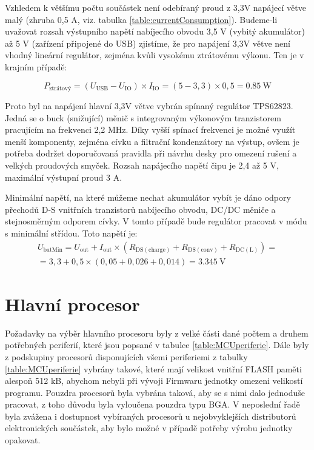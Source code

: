 

Vzhledem k většímu počtu součástek není odebíraný proud z 3,3V napájecí větve malý (zhruba 0,5 A, viz. tabulka \ref{table:currentConsumption}). Budeme-li uvažovat rozsah výstupního napětí nabíjecího obvodu 3,5 V (vybitý akumulátor) až 5 V (zařízení připojené do \ac{USB}) zjistíme, že pro napájení 3,3V větve není vhodný lineární regulátor, zejména kvůli vysokému ztrátovému výkonu. Ten je v krajním případě:

\begin{equation}
P_{\mathrm{ztrátový}} = (U_{\mathrm{USB}}-U_{\mathrm{IO}})\times I_{\mathrm{IO}}=(5-3,3)\times 0,5= \SI{0,85}{\watt}
\end{equation}

Proto byl na napájení hlavní 3,3V větve vybrán spínaný regulátor TPS62823. Jedná se o buck (snižující) měnič s integrovaným výkonovým tranzistorem pracujícím na frekvenci 2,2 MHz. Díky vyšší spínací frekvenci je možné využít menší komponenty, zejména cívku a filtrační kondenzátory na výstup, ovšem je potřeba dodržet doporučovaná pravidla při návrhu desky pro omezení rušení a velkých proudových smyček. Rozsah napájecího napětí čipu je 2,4 až 5 V, maximální výstupní proud 3 A. \cite{mGnys3WmOkWuaQHN}

Minimální napětí, na které můžeme nechat akumulátor vybít je dáno odpory přechodů D-S vnitřních tranzistorů nabíjecího obvodu, DC/DC měniče a stejnosměrným odporem cívky. V tomto případě bude regulátor pracovat v módu s minimální střídou. \cite{mGnys3WmOkWuaQHN} Toto napětí je:
\begin{equation}
\begin{matrix}
 U_{\mathrm{batMin}} = U_{\mathrm{out}} + I_{\mathrm{out}} \times (R_{\mathrm{DS(charge)}} + R_{\mathrm{DS(conv)}} + R_{\mathrm{DC(L)}})= \\
  =3,3 + 0,5 \times (0,05 + 0,026 + 0,014) = \SI{3,345}{\volt}
\end{matrix}
 \end{equation}

\section{Hlavní procesor}
Požadavky na výběr hlavního procesoru byly z velké části dané počtem a druhem potřebných periferií, které jsou popsané v tabulce \ref{table:MCUperiferie}.
Dále byly z podskupiny procesorů disponujících všemi periferiemi z tabulky \ref{table:MCUperiferie} vybrány takové, které mají velikost vnitřní FLASH paměti alespoň 512 kB, abychom nebyli při vývoji Firmwaru jednotky omezeni velikostí programu. Pouzdra procesorů byla vybrána taková, aby se s nimi dalo jednoduše pracovat, z toho důvodu byla vyloučena pouzdra typu \ac{BGA}. 
V neposlední řadě byla zvážena i dostupnost vybíraných procesorů u nejobvyklejších distributorů elektronických součástek, aby bylo možné v případě potřeby výrobu jednotky opakovat.

